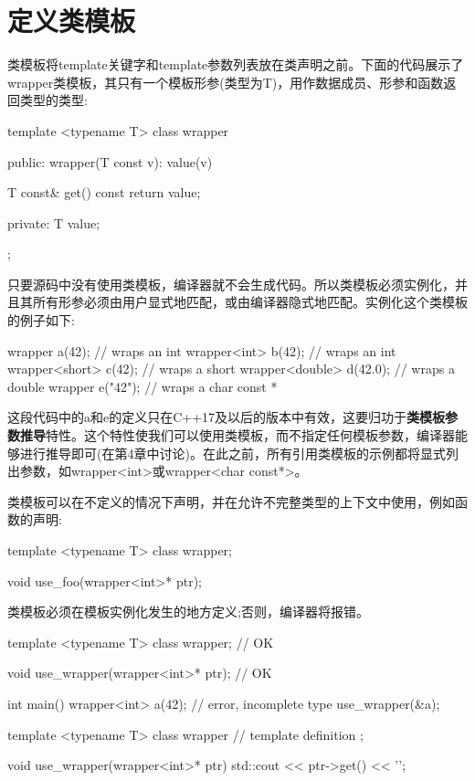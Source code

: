 \section{定义类模板}
类模板将template关键字和template参数列表放在类声明之前。下面的代码展示了wrapper类模板，其只有一个模板形参(类型为T)，用作数据成员、形参和函数返回类型的类型:

\begin{cpp}
template <typename T>
class wrapper
{
public:
	wrapper(T const v): value(v)
	{ }
	
	T const& get() const { return value; }
	
private:
	T value;
};
\end{cpp}

只要源码中没有使用类模板，编译器就不会生成代码。所以类模板必须实例化，并且其所有形参必须由用户显式地匹配，或由编译器隐式地匹配。实例化这个类模板的例子如下:

\begin{cpp}
wrapper a(42); // wraps an int
wrapper<int> b(42); // wraps an int
wrapper<short> c(42); // wraps a short
wrapper<double> d(42.0); // wraps a double
wrapper e("42"); // wraps a char const *
\end{cpp}

这段代码中的a和e的定义只在C++17及以后的版本中有效，这要归功于\textbf{类模板参数推导}特性。这个特性使我们可以使用类模板，而不指定任何模板参数，编译器能够进行推导即可(在第4章中讨论)。在此之前，所有引用类模板的示例都将显式列出参数，如wrapper<int>或wrapper<char const*>。

类模板可以在不定义的情况下声明，并在允许不完整类型的上下文中使用，例如函数的声明:

\begin{cpp}
template <typename T>
class wrapper;

void use_foo(wrapper<int>* ptr);
\end{cpp}

类模板必须在模板实例化发生的地方定义;否则，编译器将报错。

\begin{cpp}
template <typename T>
class wrapper; // OK

void use_wrapper(wrapper<int>* ptr); // OK

int main()
{
	wrapper<int> a(42); // error, incomplete type
	use_wrapper(&a);
}

template <typename T>
class wrapper
{
	// template definition
};

void use_wrapper(wrapper<int>* ptr)
{
	std::cout << ptr->get() << '\n';
}
\end{cpp}

